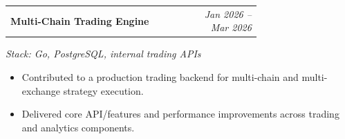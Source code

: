 \documentclass[11pt,a4paper]{article}
\makeatletter
\newcommand{\project}[4]{
  \begin{samepage}
  \vspace{0.35em}
  \noindent
  \begin{tabular*}{\linewidth}{@{}p{0.72\linewidth}@{\extracolsep{\fill}}r@{}}
    \textbf{#1} & \textit{#2} \\
  \end{tabular*}
  \textit{Stack: #3}
  \end{samepage}
  \begin{itemize}
    #4
  \end{itemize}
}
\makeatother
\begin{document}
\project
  {Multi-Chain Trading Engine}
  {Jan 2026 -- Mar 2026}
  {Go, PostgreSQL, internal trading APIs}
  {
    \item Contributed to a production trading backend for multi-chain and multi-exchange strategy execution.
    \item Delivered core API/features and performance improvements across trading and analytics components.
  }
\end{document}
